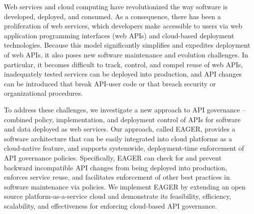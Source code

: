 Web services and cloud computing have revolutionized the way software is
developed, deployed, and consumed.  As a consequence, there has been a
proliferation of web services, which developers make accessible to users via
web application programming interfaces (web APIs) and cloud-based deployment
technologies.  Because this model significantly simplifies and expedites
deployment of web APIs, it also poses new software maintenance and evolution
challenges.  In particular, it becomes difficult to track, control, and compel
reuse of web APIs, inadequately tested services can be
deployed into production, and API changes can be introduced that
break API-user code or that breach security or organizational procedures.

To address these challenges, we investigate a new approach to API governance
-- combined policy, implementation, and deployment control of APIs for
software and data deployed as web services.  Our approach, called EAGER,
provides a software architecture that can be easily integrated into cloud
platforms as a cloud-native feature, and supports systemwide, 
deployment-time enforcement of API governance policies.
Specifically, EAGER can check for and
prevent backward incompatible API changes from
being deployed into production,
enforces service reuse, and facilitates enforcement of other best practices
in software maintenance via policies.  We implement EAGER by
extending an open source platform-as-a-service cloud and
demonstrate its feasibility, efficiency,
scalability, and effectiveness for enforcing cloud-based API governance.

